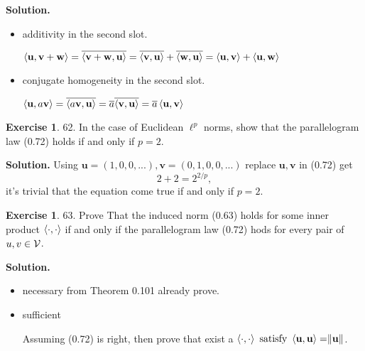 \documentclass[a4paper]{book}
\newenvironment{solution}%
{\noindent\textbf{Solution.}}%
{\qedhere}
\numberwithin{equation}{chapter}
\theoremstyle{definition}
\newtheorem{exc}[exm]{Exercise}
\begin{document}
\begin{multicols}{2}
\begin{solution}
	\begin{itemize}
		\item additivity in the second slot. 
		
		$\braket{\mathbf{u}, \mathbf{v+w}} = \overline{\braket{\mathbf{v+w}, \mathbf{u}}} = \overline{\braket{\mathbf{v}, \mathbf{u}}} + \overline{\braket{\mathbf{w}, \mathbf{u}}} = \braket{\mathbf{u}, \mathbf{v}} +\braket{\mathbf{u}, \mathbf{w}}$
		
		\item conjugate homogeneity in the second slot.
		
		$ \braket{\mathbf{u}, a\mathbf{v}}  = \overline{\braket{a\mathbf{v}, \mathbf{u}}} = \overline{a} \overline{\braket{\mathbf{v}, \mathbf{u}}} = \overline{a} \braket{\mathbf{u}, \mathbf{v}} $
	\end{itemize}
\end{solution}

\begin{exc}
	62. In the case of Euclidean $ \ell^p $ norms, show that the parallelogram law (0.72) holds if and only if $ p = 2 $.
\end{exc}

\begin{solution}
	Using $ \mathbf{u} = (1, 0, 0, ...), \mathbf{v} = (0, 1, 0, 0, ...) $ replace $ \mathbf{u,v} $ in (0.72) get 
	\begin{equation}
		2 + 2 = 2^{2/p},
	\end{equation}
	it's trivial that the equation come true if and only if $ p = 2 $.
\end{solution}

\begin{exc}
	63. Prove That the induced norm (0.63) holds for some inner product $ \braket{\cdot,\cdot} $ if and only if the parallelogram law (0.72) hods for every pair of $ \mathnormal{u,v} \in \mathcal{V} $.
\end{exc}

\begin{solution}
	\begin{itemize}
		\item necessary from Theorem 0.101 already prove.
		
		\item sufficient 
		
		Assuming (0.72) is right, then prove that exist a  $\braket{\cdot, \cdot} \text{ satisfy }\braket{\mathbf{u}, \mathbf{u}} = \rVert{\mathbf{u}}\lVert $.
		

\end{itemize}
\end{solution}
\end{multicols}
\end{document}
